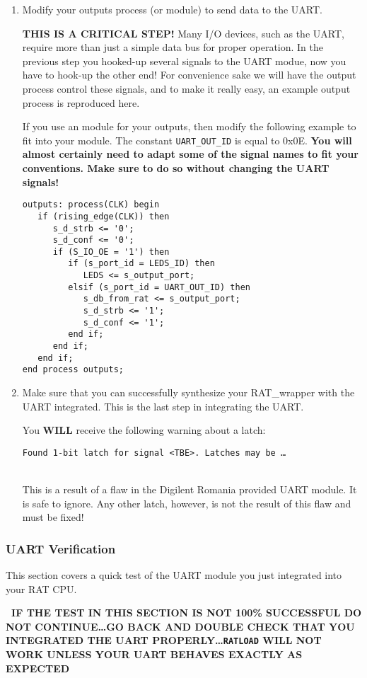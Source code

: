 \documentclass[notitlepage]{article}
\newcommand{\warningsign}{\fontencoding{U}\fontfamily{futs}\Large\selectfont\char 66\relax}
\begin{document}
\begin {enumerate}
\item Modify your outputs process (or module) to send data to the UART.
\begin{infobox}
  {\warningsign} \textbf{THIS IS A CRITICAL STEP!} Many I/O devices, such as the UART, require more than just a simple data bus for proper operation. In the previous step you hooked-up several signals to the UART modue, now you have to hook-up the other end! For convenience sake we will have the output process control these signals, and to make it really easy, an example output process is reproduced here.
\end{infobox}
If you use an module for your outputs, then modify the following example to fit into your module. The constant \texttt{UART\_OUT\_ID} is equal to 0x0E. \textbf{You will almost certainly need to adapt some of the signal names to fit your conventions. Make sure to do so without changing the UART signals!}
\begin{verbatim}
outputs: process(CLK) begin
   if (rising_edge(CLK)) then
      s_d_strb <= '0';
      s_d_conf <= '0';
      if (S_IO_OE = '1') then
         if (s_port_id = LEDS_ID) then
            LEDS <= s_output_port;
         elsif (s_port_id = UART_OUT_ID) then
            s_db_from_rat <= s_output_port;
            s_d_strb <= '1';
            s_d_conf <= '1';
         end if;
      end if;
   end if;
end process outputs;
\end{verbatim}

\item Make sure that you can successfully synthesize your RAT\_wrapper with the UART integrated. This is the last step in integrating the UART.
\begin{infobox}
  \textbf{{\warningsign}} You \textbf{WILL} receive the following warning about a latch:\\
    \centerline{\texttt{Found 1-bit latch for signal \textless TBE\textgreater. Latches may be \ldots}}\\
    This is a result of a flaw in the Digilent Romania provided UART module. It is safe to ignore. Any other latch, however, is not the result of this flaw and must be fixed!
\end{infobox}
\end{enumerate}

\subsubsection{UART Verification}
This section covers a quick test of the UART module you just integrated into your RAT CPU. 
\begin{infobox}
  {\warningsign}\textbf{~IF THE TEST IN THIS SECTION IS NOT 100\% SUCCESSFUL DO NOT CONTINUE\ldots GO BACK AND DOUBLE CHECK THAT YOU INTEGRATED THE UART PROPERLY\ldots \texttt{RATLOAD} WILL NOT WORK UNLESS YOUR UART BEHAVES EXACTLY AS EXPECTED}
\end{infobox}
\end{document}
